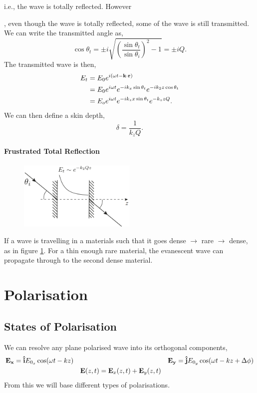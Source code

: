 \documentclass{book}
\begin{document}
i.e., the wave is totally reflected. However{, even though the wave is totally reflected, some of the wave is still transmitted. We can write the transmitted angle as,
\begin{equation}
	\cos\theta_t = \pm i \sqrt{\left(\frac{\sin\theta_t}{\sin\theta_i}\right)^2 - 1} = \pm i Q.
\end{equation}
The transmitted wave is then,
\begin{equation}
	\begin{split}
		E_t & = E_0e^{i(\omega t - \vb{k}\cdot\vb{r})} \\
		 & =E_0e^{i\omega t}e^{-ik_x\sin\theta_t} e ^{-ik_2z\cos\theta_t} \\
		 & = E_oe^{i\omega t}e^{-ik_zx\sin\theta_t}e^{-k_zzQ}.
	\end{split}
\end{equation}
We can then define a skin depth,
\begin{equation}
	\delta = \frac{1}{k_zQ}.
\end{equation}
\subsubsection{Frustrated Total Reflection}
\begin{figure}[h]
	\centering
	\includegraphics[width=0.5\textwidth]{frustrated.png}
	\caption{}
	\label{fig:frustrated}
\end{figure}
If a wave is travelling in a materials such that it goes dense $\to$ rare $\to$ dense, as in figure \ref{fig:frustrated}. For a thin enough rare material, the evanescent wave can propagate through to the second dense material.

\chapter{Polarisation}
\section{States of Polarisation}

We can resolve any plane polarised wave into its orthogonal components,
\begin{align}
	\vb{E_x} = \vu{i}E_{0_x}\cos(\omega t - kz) && && \vb{E_y} = \vu{j}E_{0_y}\cos(\omega t - kz + \Delta \phi) \\
	&& \vb{E}(z,t) = \vb{E}_x (z,t) + \vb{E}_y(z,t) && 
\end{align}
From this we will base different types of polarisations.
}
\end{document}
